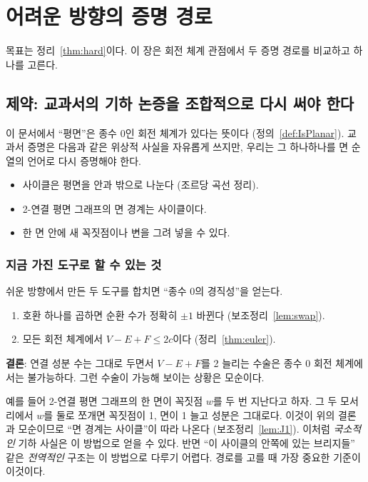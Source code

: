 \chapter{어려운 방향의 증명 경로}
\label{chap:routes}

목표는 정리~\ref{thm:hard}이다. 이 장은 회전 체계 관점에서 두 증명 경로를 비교하고 하나를 고른다.

\section{제약: 교과서의 기하 논증을 조합적으로 다시 써야 한다}

이 문서에서 ``평면''은 종수 0인 회전 체계가 있다는 뜻이다 (정의~\ref{def:IsPlanar}). 교과서 증명은 다음과
같은 위상적 사실을 자유롭게 쓰지만, 우리는 그 하나하나를 면 순열의 언어로 다시 증명해야 한다.
\begin{itemize}
  \item 사이클은 평면을 안과 밖으로 나눈다 (조르당 곡선 정리).
  \item 2-연결 평면 그래프의 면 경계는 사이클이다.
  \item 한 면 안에 새 꼭짓점이나 변을 그려 넣을 수 있다.
\end{itemize}

\subsection*{지금 가진 도구로 할 수 있는 것}

쉬운 방향에서 만든 두 도구를 합치면 ``종수 0의 경직성''을 얻는다.
\begin{enumerate}
  \item 호환 하나를 곱하면 순환 수가 정확히 \(\pm 1\) 바뀐다 (보조정리~\ref{lem:swap}).
  \item 모든 회전 체계에서 \(V - E + F \le 2c\)이다 (정리~\ref{thm:euler}).
\end{enumerate}
\textbf{결론}: 연결 성분 수는 그대로 두면서 \(V - E + F\)를 2 늘리는 수술은 종수 0 회전 체계에서는
불가능하다. 그런 수술이 가능해 보이는 상황은 모순이다.

예를 들어 2-연결 평면 그래프의 한 면이 꼭짓점 \(w\)를 두 번 지난다고 하자. 그 두 모서리에서 \(w\)를 둘로
쪼개면 꼭짓점이 1, 면이 1 늘고 성분은 그대로다. 이것이 위의 결론과 모순이므로 ``면 경계는 사이클''이 따라
나온다 (보조정리~\ref{lem:J1}). 이처럼 \emph{국소적인} 기하 사실은 이 방법으로 얻을 수 있다. 반면 ``이
사이클의 안쪽에 있는 브리지들'' 같은 \emph{전역적인} 구조는 이 방법으로 다루기 어렵다. 경로를 고를 때
가장 중요한 기준이 이것이다.

